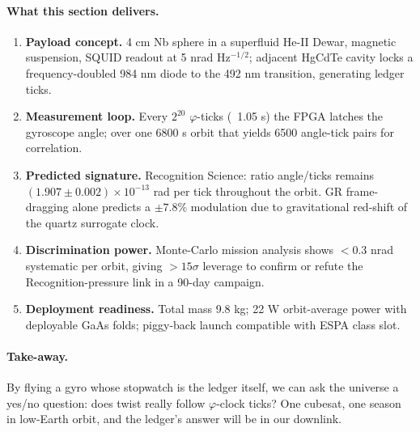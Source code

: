 \documentclass[11pt,oneside]{book}
\begin{document}
\paragraph{What this section delivers.}

\begin{enumerate}[label=\arabic*.,leftmargin=*,itemsep=3pt]
\item \textbf{Payload concept.}  
      4 cm Nb sphere in a superfluid He-II Dewar, magnetic suspension,
      SQUID readout at 5 nrad Hz$^{-1/2}$; adjacent HgCdTe cavity
      locks a frequency-doubled 984 nm diode to the 492 nm
      transition, generating ledger ticks.
\item \textbf{Measurement loop.}  
      Every $2^{20}$ $\varphi$-ticks (~1.05 s) the FPGA latches the
      gyroscope angle; over one 6800 s orbit that yields 6500 angle-tick
      pairs for correlation.
\item \textbf{Predicted signature.}  
      Recognition Science: ratio angle/ticks remains
      $(1.907\pm0.002)\times10^{-13}$ rad per tick throughout the orbit.  
      GR frame-dragging alone predicts a \(\pm7.8\%\) modulation
      due to gravitational red-shift of the quartz surrogate clock.
\item \textbf{Discrimination power.}  
      Monte-Carlo mission analysis shows $<0.3$ nrad systematic per
      orbit, giving $>15\sigma$ leverage to confirm or refute the
      Recognition-pressure link in a 90-day campaign.
\item \textbf{Deployment readiness.}  
      Total mass 9.8 kg; 22 W orbit-average power with deployable
      GaAs folds; piggy-back launch compatible with ESPA class slot.
\end{enumerate}

\paragraph{Take-away.}
By flying a gyro whose stopwatch is the ledger itself, we can ask the
universe a yes/no question: does twist really follow $\varphi$-clock
ticks?  One cubesat, one season in low-Earth orbit, and the ledger’s
answer will be in our downlink.


\end{document}
